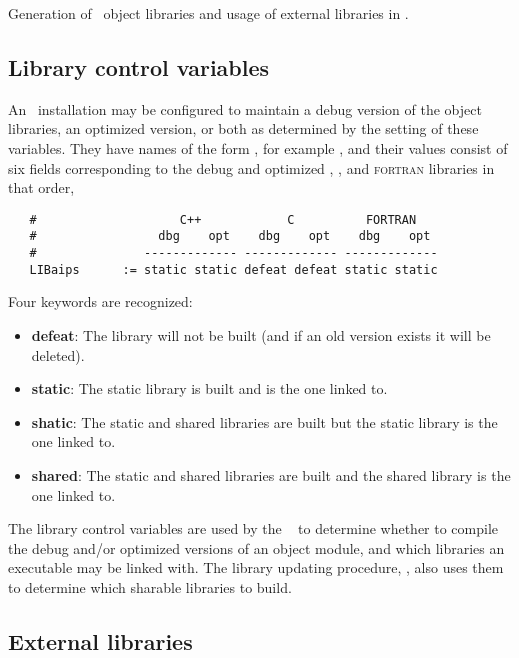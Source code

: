Generation of \aipspp\ object libraries and usage of external libraries in
\aipspp.

\subsection*{Library control variables}

An \aipspp\ installation may be configured to maintain a debug version of the
object libraries, an optimized version, or both as determined by the setting
of these variables.  They have names of the form ,
for example , and their values consist of six fields
corresponding to the debug and optimized \cplusplus, , and
\textsc{fortran} libraries in that order,

\begin{verbatim}
   #                    C++            C          FORTRAN
   #                 dbg    opt    dbg    opt    dbg    opt
   #               ------------- ------------- -------------
   LIBaips      := static static defeat defeat static static
\end{verbatim}

\noindent
Four keywords are recognized:
\begin{itemize}
\item
   \textbf{defeat}: The library will not be built (and if an old version
   exists it will be deleted).
\item
   \textbf{static}: The static library is built and is the one linked to.
\item
   \textbf{shatic}: The static and shared libraries are built but the static
   library is the one linked to.
\item
   \textbf{shared}: The static and shared libraries are built and the shared
   library is the one linked to.
\end{itemize}

The library control variables are used by the \aipspp\  to
determine whether to compile the debug and/or optimized versions of an object
module, and which libraries an executable may be linked with.  The library
updating procedure, , also uses them to determine which
sharable libraries to build.

\subsection*{External libraries}


